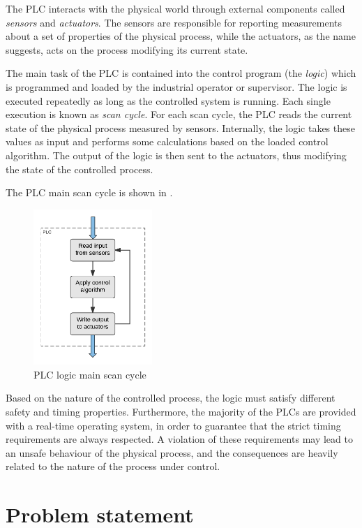 The PLC interacts with the physical world through external components called \emph{sensors} and \emph{actuators}.
The sensors are responsible for reporting measurements about a set of properties of the physical process,
while the actuators, as the name suggests, acts on the process modifying its current state.

The main task of the PLC is contained into the control program (the \emph{logic}) which is programmed and loaded by the industrial operator or supervisor.
The logic is executed repeatedly as long as the controlled system is running. Each single execution is known as \emph{scan cycle}.
For each scan cycle, the PLC reads the current state of the physical process measured by sensors.
Internally, the logic takes these values as input and performs some calculations based on the loaded control algorithm.
The output of the logic is then sent to the actuators, thus modifying the state of the controlled process.

The PLC main scan cycle is shown in \myfig{\ref{fig:scan_cycle}}.
\begin{figure}[h]
\centerline{\includegraphics[width=0.4\textwidth]{res/scan_cycle}}
\caption{PLC logic main scan cycle\label{fig:scan_cycle}}
\end{figure}

Based on the nature of the controlled process, the logic must satisfy different safety and timing properties.
Furthermore, the majority of the PLCs are provided with a real-time operating system, in order to guarantee that the strict timing requirements are always respected.
A violation of these requirements may lead to an unsafe behaviour of the physical process, and the consequences are heavily related to the nature of the process under control.


\section{Problem statement}

